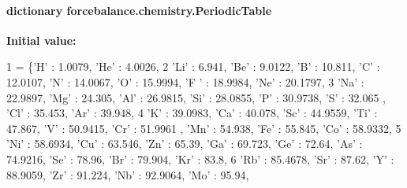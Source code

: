 \hypertarget{namespaceforcebalance_1_1chemistry_a3b40e0b86fc49653419be09202f42ef1}{
\paragraph[{Periodic\-Table}]{\setlength{\rightskip}{0pt plus 5cm}dictionary forcebalance.\-chemistry.\-Periodic\-Table}}\label{namespaceforcebalance_1_1chemistry_a3b40e0b86fc49653419be09202f42ef1}
{\bfseries Initial value\-:}
\begin{DoxyCode}
1 = \{\textcolor{stringliteral}{'H'} : 1.0079, \textcolor{stringliteral}{'He'} : 4.0026, 
2                  \textcolor{stringliteral}{'Li'} : 6.941, \textcolor{stringliteral}{'Be'} : 9.0122, \textcolor{stringliteral}{'B'} : 10.811, \textcolor{stringliteral}{'C'} : 12.0107, \textcolor{stringliteral}{'N'} : 14.0067, \textcolor{stringliteral}{'O'} : 15.9994, \textcolor{stringliteral}{'F
      '} : 18.9984, \textcolor{stringliteral}{'Ne'} : 20.1797,
3                  \textcolor{stringliteral}{'Na'} : 22.9897, \textcolor{stringliteral}{'Mg'} : 24.305, \textcolor{stringliteral}{'Al'} : 26.9815, \textcolor{stringliteral}{'Si'} : 28.0855, \textcolor{stringliteral}{'P'} : 30.9738, \textcolor{stringliteral}{'S'} : 32.065
      , \textcolor{stringliteral}{'Cl'} : 35.453, \textcolor{stringliteral}{'Ar'} : 39.948, 
4                  \textcolor{stringliteral}{'K'} : 39.0983, \textcolor{stringliteral}{'Ca'} : 40.078, \textcolor{stringliteral}{'Sc'} : 44.9559, \textcolor{stringliteral}{'Ti'} : 47.867, \textcolor{stringliteral}{'V'} : 50.9415, \textcolor{stringliteral}{'Cr'} : 51.9961
      , \textcolor{stringliteral}{'Mn'} : 54.938, \textcolor{stringliteral}{'Fe'} : 55.845, \textcolor{stringliteral}{'Co'} : 58.9332, 
5                  \textcolor{stringliteral}{'Ni'} : 58.6934, \textcolor{stringliteral}{'Cu'} : 63.546, \textcolor{stringliteral}{'Zn'} : 65.39, \textcolor{stringliteral}{'Ga'} : 69.723, \textcolor{stringliteral}{'Ge'} : 72.64, \textcolor{stringliteral}{'As'} : 74.9216, \textcolor{stringliteral}{
      'Se'} : 78.96, \textcolor{stringliteral}{'Br'} : 79.904, \textcolor{stringliteral}{'Kr'} : 83.8, 
6                  \textcolor{stringliteral}{'Rb'} : 85.4678, \textcolor{stringliteral}{'Sr'} : 87.62, \textcolor{stringliteral}{'Y'} : 88.9059, \textcolor{stringliteral}{'Zr'} : 91.224, \textcolor{stringliteral}{'Nb'} : 92.9064, \textcolor{stringliteral}{'Mo'} : 95.94, \textcolor{stringliteral}{
}
\end{DoxyCode}
